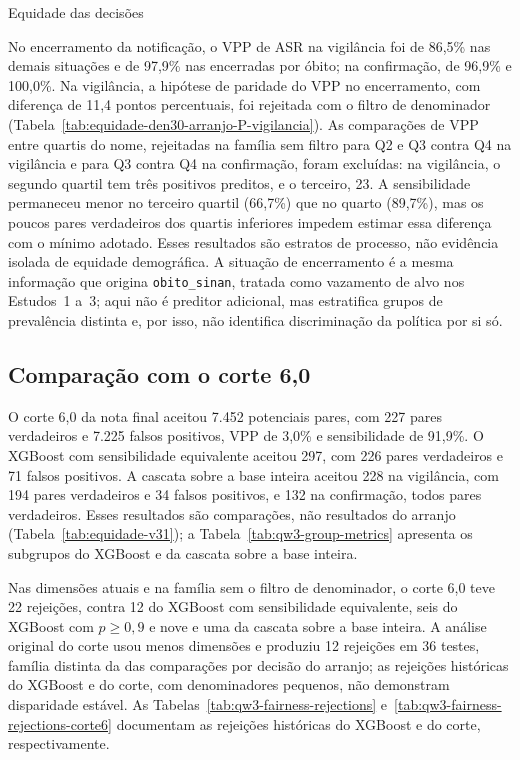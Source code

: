 \begin{chapter}{Equidade das decisões}


No encerramento da notificação, o VPP de ASR na vigilância foi de 86,5\% nas demais situações e de 97,9\% nas encerradas por óbito; na confirmação, de 96,9\% e 100,0\%. Na vigilância, a hipótese de paridade do VPP no encerramento, com diferença de 11,4 pontos percentuais, foi rejeitada com o filtro de denominador (Tabela~\ref{tab:equidade-den30-arranjo-P-vigilancia}). As comparações de VPP entre quartis do nome, rejeitadas na família sem filtro para Q2 e Q3 contra Q4 na vigilância e para Q3 contra Q4 na confirmação, foram excluídas: na vigilância, o segundo quartil tem três positivos preditos, e o terceiro, 23. A sensibilidade permaneceu menor no terceiro quartil (66,7\%) que no quarto (89,7\%), mas os poucos pares verdadeiros dos quartis inferiores impedem estimar essa diferença com o mínimo adotado. Esses resultados são estratos de processo, não evidência isolada de equidade demográfica. A situação de encerramento é a mesma informação que origina \texttt{obito\_sinan}, tratada como vazamento de alvo nos Estudos~1 a~3; aqui não é preditor adicional, mas estratifica grupos de prevalência distinta e, por isso, não identifica discriminação da política por si só.

\subsection{Comparação com o corte 6,0}\label{sec:e5-resultados-corte6}

O corte 6,0 da nota final aceitou 7.452 potenciais pares, com 227 pares verdadeiros e 7.225 falsos positivos, VPP de 3,0\% e sensibilidade de 91,9\%. O XGBoost com sensibilidade equivalente aceitou 297, com 226 pares verdadeiros e 71 falsos positivos. A cascata sobre a base inteira aceitou 228 na vigilância, com 194 pares verdadeiros e 34 falsos positivos, e 132 na confirmação, todos pares verdadeiros. Esses resultados são comparações, não resultados do arranjo (Tabela~\ref{tab:equidade-v31}); a Tabela~\ref{tab:qw3-group-metrics} apresenta os subgrupos do XGBoost e da cascata sobre a base inteira.





Nas dimensões atuais e na família sem o filtro de denominador, o corte 6,0 teve 22 rejeições, contra 12 do XGBoost com sensibilidade equivalente, seis do XGBoost com $p\geq0{,}9$ e nove e uma da cascata sobre a base inteira. A análise original do corte usou menos dimensões e produziu 12 rejeições em 36 testes, família distinta da das comparações por decisão do arranjo; as rejeições históricas do XGBoost e do corte, com denominadores pequenos, não demonstram disparidade estável. As Tabelas~\ref{tab:qw3-fairness-rejections} e~\ref{tab:qw3-fairness-rejections-corte6} documentam as rejeições históricas do XGBoost e do corte, respectivamente.


\end{chapter}
